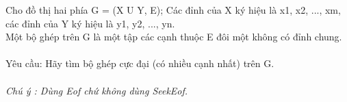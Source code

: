 Cho đồ thị hai phía G = (X U Y, E); Các đỉnh của X ký hiệu là x1, x2, ..., xm, các đỉnh của Y ký hiệu là y1, y2, ..., yn.   
\\   Một bộ ghép trên G là một tập các cạnh thuộc E đôi một không có đỉnh chung.   
\\
\\       Yêu cầu: Hãy tìm bộ ghép cực đại (có nhiều cạnh nhất) trên G.      
\\
\\\textit{    Chú ý : Dùng         Eof        chứ không dùng         SeekEof.       }

\